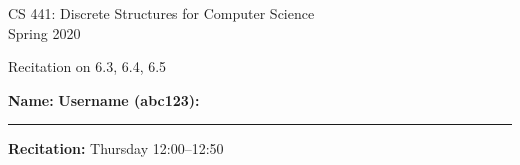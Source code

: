 \documentclass[12pt]{article}
\begin{document}
\begin{center}
CS 441: Discrete Structures for Computer Science \\
{\smaller[1] Spring 2020} \\

\vspace {0.25in}

Recitation on 6.3, 6.4, 6.5
\end{center}

\vspace{0.25in}

{\smaller[1]
\textbf{Name:} \hrulefill
\hspace{1em}
\textbf{Username (abc123):} \rule{1.25in}{0.4pt}

\null \textbf{Recitation:}
\hspace{2em}
Thursday 12:00--12:50 \hfill
}
\end{document}
